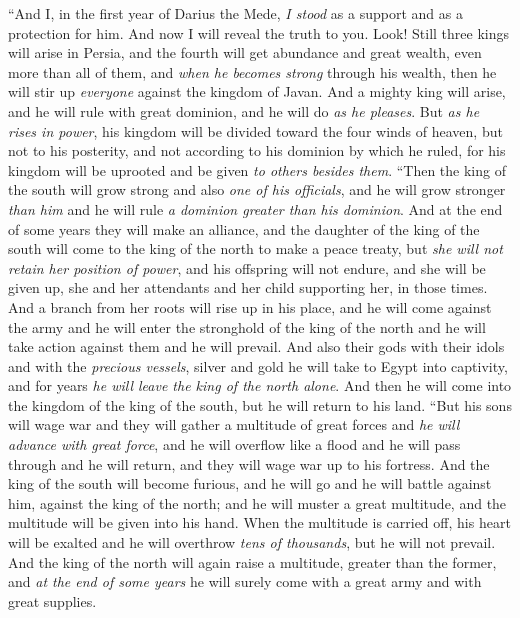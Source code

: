 \begin{biblechapter} %
 “And I, in the first year of Darius the Mede, \textit{I stood} as a support and as a protection for him.
\verse And now I will reveal the truth to you. Look! Still three kings will arise in Persia, and the fourth will get abundance and great wealth, even more than all of them, and \textit{when he becomes strong} through his wealth, then he will stir up \textit{everyone} against the kingdom of Javan.
\verse And a mighty king will arise, and he will rule with great dominion, and he will do \textit{as he pleases}.
\verse But \textit{as he rises in power}, his kingdom will be divided toward the four winds of heaven, but not to his posterity, and not according to his dominion by which he ruled, for his kingdom will be uprooted and be given \textit{to others besides them}.
\verse “Then the king of the south will grow strong and also \textit{one of his officials}, and he will grow stronger \textit{than him} and he will rule \textit{a dominion greater than his dominion}.
\verse And at the end of some years they will make an alliance, and the daughter of the king of the south will come to the king of the north to make a peace treaty, but \textit{she will not retain her position of power}, and his offspring will not endure, and she will be given up, she and her attendants and her child supporting her, in those times.
\verse And a branch from her roots will rise up in his place, and he will come against the army and he will enter the stronghold of the king of the north and he will take action against them and he will prevail.
\verse And also their gods with their idols and with the \textit{precious vessels}, silver and gold he will take to Egypt into captivity, and for years \textit{he will leave the king of the north alone}.
\verse And then he will come into the kingdom of the king of the south, but he will return to his land.
\verse “But his sons will wage war and they will gather a multitude of great forces and \textit{he will advance with great force}, and he will overflow like a flood and he will pass through and he will return, and they will wage war up to his fortress.
\verse And the king of the south will become furious, and he will go and he will battle against him, against the king of the north; and he will muster a great multitude, and the multitude will be given into his hand.
\verse When the multitude is carried off, his heart will be exalted and he will overthrow \textit{tens of thousands}, but he will not prevail.
\verse And the king of the north will again raise a multitude, greater than the former, and \textit{at the end of some years} he will surely come with a great army and with great supplies.

\end{biblechapter}
